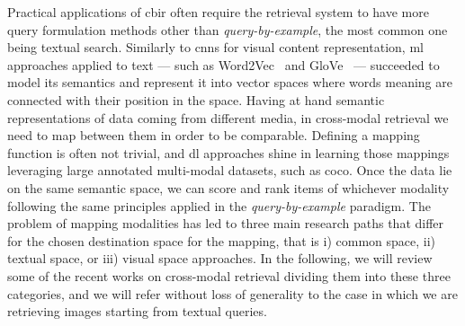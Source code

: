 Practical applications of \gls{cbir} often require the retrieval system to have more query formulation methods other than \emph{query-by-example}, the most common one being textual search.
Similarly to \glspl{cnn} for visual content representation, \gls{ml} approaches applied to text --- such as Word2Vec~\cite{mikolov2013distributed} and GloVe~\cite{pennington2014glove} --- succeeded to model its semantics and represent it into vector spaces where words meaning are connected with their position in the space.
Having at hand semantic representations of data coming from different media, in cross-modal retrieval we need to map between them in order to be comparable.
Defining a mapping function is often not trivial, and \gls{dl} approaches shine in learning those mappings leveraging large annotated multi-modal datasets, such as \gls{coco}.
Once the data lie on the same semantic space, we can score and rank items of whichever modality following the same principles applied in the \emph{query-by-example} paradigm.
The problem of mapping modalities has led to three main research paths that differ for the chosen destination space for the mapping, that is i) common space, ii) textual space, or iii) visual space approaches.
In the following, we will review some of the recent works on cross-modal retrieval dividing them into these three categories, and we will refer without loss of generality to the case in which we are retrieving images starting from textual queries. %

